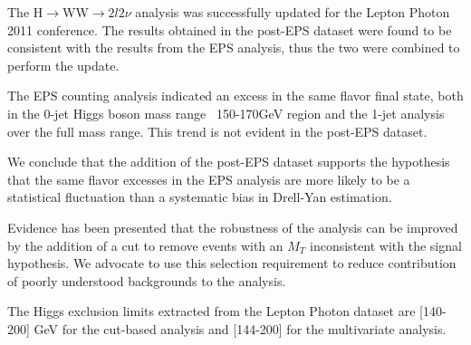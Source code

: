 
The H$\to$WW$\to2l2\nu$ analysis was successfully updated for the
Lepton Photon 2011 conference. The results obtained in the post-EPS
dataset were found to be consistent with the results from the EPS
analysis, thus the two were combined to perform the update.

The EPS counting analysis indicated an excess in the same flavor final
state, both in the 0-jet Higgs boson mass range ~150-170GeV region and
the 1-jet analysis over the full mass range.  This trend is not
evident in the post-EPS dataset.

We conclude that the addition of the post-EPS dataset 
supports the hypothesis that the same flavor excesses in the EPS
analysis are more likely to be a statistical fluctuation
than a systematic bias in Drell-Yan estimation.

Evidence has been presented that the robustness of the analysis can be
improved by the addition of a cut to remove events with an $M_T$
inconsistent with the signal hypothesis. We advocate to use this
selection requirement to reduce contribution of poorly understood
backgrounds to the analysis.

The Higgs exclusion limits extracted from the Lepton Photon
dataset are [140-200] GeV for the cut-based analysis and
[144-200] for the multivariate analysis.


